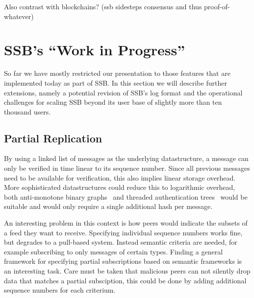\documentclass[10pt,sigconf]{acmart}
\begin{document}
Also contrast with blockchains? (ssb sidesteps consensus and thus proof-of-whatever)


\section{SSB's ``Work in Progress''}

So far we have mostly restricted our presentation to those features that are implemented today as part of SSB. In this section we will describe further extensions, namely a potential revision of SSB's log format and the operational challenges for scaling SSB beyond its user base of slightly more than ten thousand users.


\subsection{Partial Replication}

By using a linked list of messages as the underlying datastructure, a message can only be verified in time linear to its sequence number. Since all previous messages need to be available for verification, this also implies linear storage overhead. More sophisticated datastructures could reduce this to logarithmic overhead, both anti-monotone binary graphs~\cite{buldas1998new} and threaded authentication trees~\cite{buldas2000optimally} would be suitable and would only require a single additional hash per message.

An interesting problem in this context is how peers would indicate the subsets of a feed they want to receive. Specifying individual sequence numbers works fine, but degrades to a pull-based system. Instead semantic criteria are needed, for example subscribing to only messages of certain types. Finding a general framework for specifying partial subscriptions based on semantic frameworks is an interesting task. Care must be taken that malicious peers can not silently drop data that matches a partial subsciption, this could be done by adding additional sequence numbers for each criterium.
\end{document}

